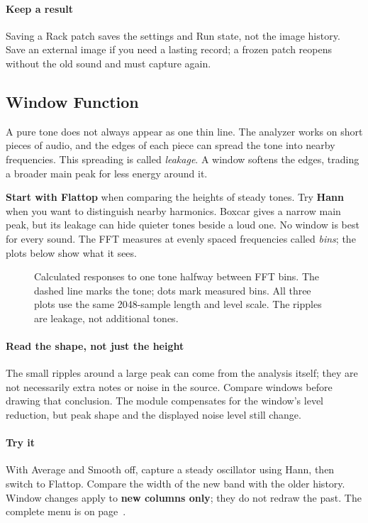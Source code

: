 \paragraph{Keep a result}
Saving a Rack patch saves the settings and Run state, not the image history.
Save an external image if you need a lasting record; a frozen patch reopens
without the old sound and must capture again.

\clearpage
\subsection{Window Function}
A pure tone does not always appear as one thin line. The analyzer works on
short pieces of audio, and the edges of each piece can spread the tone into
nearby frequencies. This spreading is called \textit{leakage}. A window
softens the edges, trading a broader main peak for less energy around it.

\textbf{Start with Flattop} when comparing the heights of steady tones.
Try \textbf{Hann} when you want to distinguish nearby harmonics. Boxcar gives
a narrow main peak, but its leakage can hide quieter tones beside a loud one.
No window is best for every sound. The FFT measures at evenly spaced
frequencies called \textit{bins}; the plots below show what it sees.

\begin{figure}[!htp]
\centering

\caption{Calculated responses to one tone halfway between FFT bins.
The dashed line marks the tone; dots mark measured bins. All three plots use
the same 2048-sample length and level scale. The ripples are leakage, not
additional tones.}
\end{figure}

\paragraph{Read the shape, not just the height}
The small ripples around a large peak can come from the analysis itself;
they are not necessarily extra notes or noise in the source. Compare windows
before drawing that conclusion. The module compensates for the window's
level reduction, but peak shape and the displayed noise level still change.

\paragraph{Try it}
With Average and Smooth off, capture a steady oscillator using Hann, then
switch to Flattop. Compare the width of the new band with the older history.
Window changes apply to \textbf{new columns only}; they do not redraw the
past. The complete menu is on page~\pageref{sec:control-values}.

